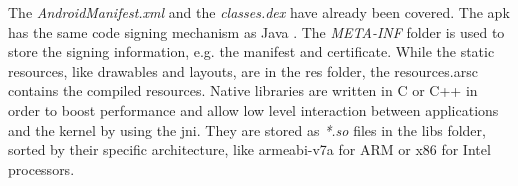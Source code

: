 The \textit{AndroidManifest.xml} and the \textit{classes.dex} have already been covered.
\newline
The \gls{apk} has the same code signing mechanism as Java .
The \textit{META-INF} folder is used to store the signing information, e.g. the manifest and certificate. \cite{codeSigning} \cite{metaJava}
\newline
While the static resources, like drawables and layouts, are in the res folder, the resources.arsc contains the compiled resources.
\newline
Native libraries are written in C or C++ in order to boost performance and allow low level interaction between applications and the kernel by using the \gls{jni}.
They are stored as \textit{*.so} files in the libs folder, sorted by their specific architecture, like armeabi-v7a for ARM or x86 for Intel processors.
\cite{kovachevaMaster} \cite{ehringerDalvik}
